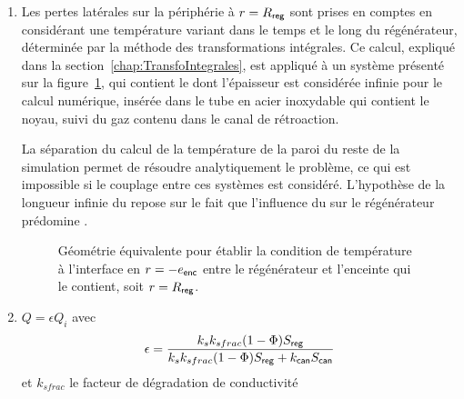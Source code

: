 \begin{enumerate}[label=\textbf{(\roman*)}]
%
%


\item Les pertes latérales sur la périphérie à $r=R_{\sf reg}$ sont prises en comptes en considérant une température variant dans le temps et le long du régénérateur, déterminée par la méthode des transformations intégrales. Ce calcul, expliqué dans la section~\ref{chap:TransfoIntegrales}, est appliqué à un système présenté sur la figure~\ref{fig:TemperatureCanisterConditionLimite}, qui contient le  dont l'épaisseur est considérée infinie pour le calcul numérique, insérée dans le tube en acier inoxydable qui contient le noyau, suivi du gaz contenu dans le canal de rétroaction.

La séparation du calcul de la température de la paroi du reste de la simulation permet de résoudre analytiquement le problème, ce qui est impossible si le couplage entre ces systèmes est considéré. L'hypothèse de la longueur infinie du  repose sur le fait que l'influence du  sur le régénérateur prédomine .


\begin{figure}[!ht]
    \centering
    
    \caption{Géométrie équivalente pour établir la condition de température à l'interface en $r=-e_{\sf enc}$ entre le régénérateur et l'enceinte qui le contient, soit $r=R_{\sf reg}$. }
    \label{fig:TemperatureCanisterConditionLimite}
\end{figure}

\item {}

$Q=\epsilon Q_i$ avec 
\begin{equation}
	\epsilon = \frac{k_s k_{sfrac} (1-\Phi)S_{\sf reg}}{k_s k_{sfrac} (1-\Phi)S_{\sf reg} + k_{\sf can} S_{\sf can}}
\end{equation}
et $k_{sfrac}$ le facteur de dégradation de conductivité \cite{lewis_measurement_1998}

\end{enumerate}

